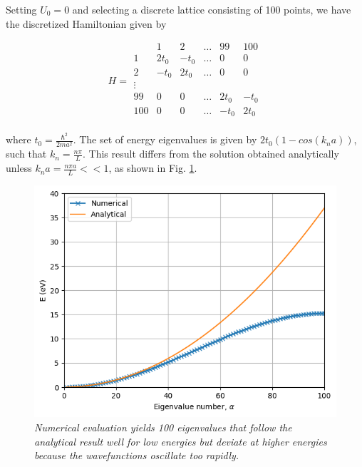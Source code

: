\documentclass{resonance}
\begin{document}
Setting $U_{0} = 0$ and selecting a discrete lattice consisting of 100 points, we have the discretized Hamiltonian given by 

\begin{equation}
H =
\begin{matrix}
     & 1 & 2 & \ldots & 99 & 100 \\
    1 & 2t_0 & -t_0 & \ldots & 0 & 0 \\
    2 & -t_0 & 2t_0 & \ldots & 0 & 0 \\
    \vdots  &  &  &  &  &  \\
    99 & 0 & 0 & \ldots & 2t_0 & -t_0 \\
    100 & 0 & 0 & \ldots & -t_0 & 2t_0 \\
\end{matrix}   
\end{equation}

where $t_0 = \frac{\hbar^2}{2ma^{2}}$. The set of energy eigenvalues is given by $2t_{0}(1-cos(k_{n}a))$, such that $k_{n}=\frac{n\pi}{L}$. This result differs from the solution obtained analytically unless $k_{n}a = \frac{n\pi a}{L} << 1$, as shown in Fig. \ref{discrete_PIB}.
\begin{figure}[!t]
\caption{\textit{Numerical evaluation yields 100 eigenvalues that follow the analytical result well for low energies but deviate at higher energies because the wavefunctions oscillate too rapidly.}}\label{discrete_PIB}
\centering
\includegraphics[scale=0.6]{discrete_PIB.png}
\end{figure}

\vspace{10pt}
\end{document}
